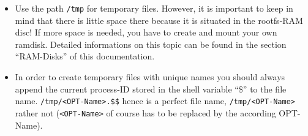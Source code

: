 \begin{itemize}
      \item Use the path \texttt{/tmp} for temporary files. However, it is important
	to keep in mind that there is little space there because it is situated in the
	rootfs-RAM disc! If more space is needed, you have to create and mount your own
	ramdisk. Detailed informations on this topic can be found in the section ``RAM-Disks''
        of this documentation.

    \item In order to create temporary files with unique names you should always append
      the current process-ID stored in the shell variable ``\$'' to the file name.
      \texttt{/tmp/<OPT-Name>.\$\$} hence is a perfect file name,
      \texttt{/tmp/<OPT-Name>} rather not (\texttt{<OPT-Name>} of course has
      to be replaced by the according OPT-Name).

\end{itemize}
